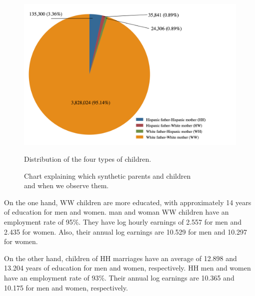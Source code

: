 \documentclass[12pt, fullpage]{article}
\begin{document}
\begin{figure}[H]
\begin{center}
\caption{Distribution of the four types of children.}
\includegraphics[width=\textwidth]{PirChart2.png} 
\label{fig:dist}
\end{center}
\end{figure}

\newpage
\begin{figure}[H]
\begin{center}
\caption{Chart explaining which synthetic parents and children \\
and when we observe them.}
\label{flowchart1}
\end{center}
\end{figure}

On the one hand, WW children are more educated, with approximately 14 years of education for men and women. man and woman WW children have an employment rate of 95\%. They have log hourly earnings of 2.557 for men and 2.435 for women. Also, their annual log earnings are 10.529 for men and 10.297 for women.

On the other hand, children of HH marriages have an average of 12.898 and 13.204 years of education for men and women, respectively. HH men and women have an employment rate of 93\%. Their annual log earnings are 10.365 and 10.175 for men and women, respectively. 
\end{document}
